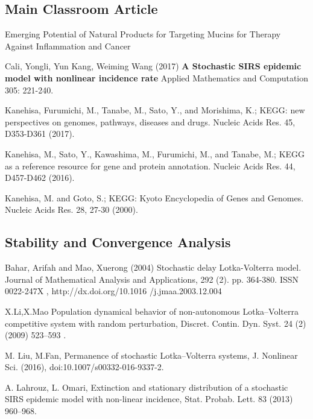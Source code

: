 
\begin{thebibliography}{00}

\subsection{Main Classroom Article}

Emerging Potential of Natural Products for Targeting Mucins for Therapy Against Inflammation and Cancer

Cali, Yongli, Yun Kang, Weiming Wang (2017)
\newblock \textbf{A Stochastic SIRS epidemic model with nonlinear incidence rate}
\newblock Applied Mathematics and Computation 305: 221-240.

 Kanehisa, Furumichi, M., Tanabe, M., Sato, Y., and Morishima, K.; 
\newblock KEGG: new perspectives on genomes, pathways, diseases and drugs. 
\newblock Nucleic Acids Res. 45, D353-D361 (2017).

 Kanehisa, M., Sato, Y., Kawashima, M., Furumichi, M., and Tanabe, M.; 
\newblock KEGG as a reference resource for gene and protein annotation. 
\newblock Nucleic Acids Res. 44, D457-D462 (2016).

 Kanehisa, M. and Goto, S.; 
\newblock KEGG: Kyoto Encyclopedia of Genes and Genomes. 
\newblock Nucleic Acids Res. 28, 27-30 (2000). 

\subsection{Stability and Convergence Analysis}

Bahar, Arifah and Mao, Xuerong (2004) 
\newblock Stochastic delay Lotka-Volterra model. 
\newblock Journal of Mathematical Analysis and Applications, 292 (2). pp. 364-380. ISSN 0022-247X , http://dx.doi.org/10.1016
/j.jmaa.2003.12.004

 X.Li,X.Mao
\newblock Population dynamical behavior of non-autonomous Lotka–Volterra competitive system with random perturbation, 
\newblock Discret. Contin. Dyn. Syst. 24 (2) (2009) 523–593 .

 M. Liu, M.Fan, 
\newblock Permanence of stochastic Lotka–Volterra systems,
\newblock J. Nonlinear Sci. (2016), doi:10.1007/s00332-016-9337-2.

 A. Lahrouz, L. Omari,
\newblock Extinction and stationary distribution of a stochastic SIRS epidemic model with non-linear incidence,
\newblock Stat. Probab. Lett. 83 (2013) 960–968.


\end{thebibliography}
